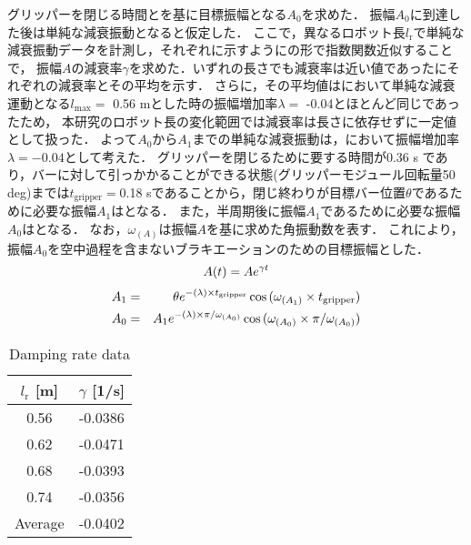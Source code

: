         グリッパーを閉じる時間とを基に目標振幅となる$A_0$を求めた．
        振幅$A_0$に到達した後は単純な減衰振動となると仮定した．
        ここで，異なるロボット長$l_{\mathrm{r}}$で単純な減衰振動データを計測し，それぞれに示すようにの形で指数関数近似することで，
        振幅$A$の減衰率$\gamma$を求めた．いずれの長さでも減衰率は近い値であったにそれぞれの減衰率とその平均を示す．
        さらに，その平均値はにおいて単純な減衰運動となる$l_{\mathrm{max}} =$ 0.56 mとした時の振幅増加率$\lambda =$ -0.04とほとんど同じであったため，
        本研究のロボット長の変化範囲では減衰率は長さに依存せずに一定値として扱った．
        よって$A_0$から$A_1$までの単純な減衰振動は，において振幅増加率$\lambda=-0.04$として考えた．
        グリッパーを閉じるために要する時間が0.36 s であり，バーに対して引っかかることができる状態(グリッパーモジュール回転量50 deg)までは$t_{\mathrm{gripper}} =$0.18 sであることから，閉じ終わりが目標バー位置$\theta$であるために必要な振幅$A_1$はとなる．
        また，半周期後に振幅$A_1$であるために必要な振幅$A_0$はとなる．
        なお，$\omega_{(A)}$は振幅$A$を基に求めた角振動数を表す．
        これにより，振幅$A_0$を空中過程を含まないブラキエーションのための目標振幅とした．
        \begin{eqnarray}
                \equlabel{edamp}
                A(t)=A e^{\gamma t}
        \end{eqnarray}
        \begin{eqnarray}
                \equlabel{A1}
                A_1&=&\theta e^{-(\lambda)\times t_{\mathrm{gripper}}}\cos{(\omega_{(A_1)}\times t_{\mathrm{gripper}})}\\
                \equlabel{A0}
                A_0&=&A_1 e^{-(\lambda)\times\pi/\omega_{(A_0)}}\cos{(\omega_{(A_0)}\times\pi/\omega_{(A_0)})}
                \end{eqnarray}
        \begin{table}[bh]
                \begin{center}
                        \caption{Damping rate data}
                        \vspace{2mm}
                        \begin{tabular}{c|c}
                        \hline
                        $l_{\mathrm{r}}$ [m] & $\gamma$ [1/s]\\
                        \hline
                        0.56 & -0.0386\\ 
                        0.62 & -0.0471\\ 
                        0.68 & -0.0393\\
                        0.74 & -0.0356\\                         
                        \hline
                        \hline
                        Average & -0.0402\\                      
                        \hline
                        \end{tabular}
                \end{center}
                \end{table}
